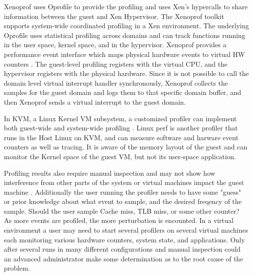 \indent Xenoprof uses Oprofile to provide the profiling and uses Xen's hypercalls to share information between the guest and Xen Hypervisor.  The Xenoprof toolkit supports system-wide coordinated profiling in a Xen environment.  The underlying Oprofile uses statistical profiling across domains and can track functions running in the user space, kernel space, and in the hypervisor.  Xenoprof provides a performance event interface which maps physical hardware events to virtual HW counters \cite{santos, menon2}.   The guest-level profiling registers with the virtual CPU, and the hypervisor registers with the physical hardware.  Since it is not possible to call the domain level virtual interrupt handler synchronously, Xenoprof collects the samples for the guest domain and logs them to that specific domain buffer, and then Xenoprof sends a virtual interrupt to the guest domain.

\indent In KVM, a Linux Kernel VM subsystem, a customized profiler can implement both guest-wide and system-wide profiling \cite{du2}.  Linux perf is another profiler that runs in the Host Linux on KVM, and can measure software and harware event counters as well as tracing.  It is aware of the memory layout of the guest and can monitor the Kernel space of the guest VM, but not its user-space application. 

\indent Profiling results also require manual inspection and may not show how interference from other parts of the system or virtual machines impact the guest machine \cite{traeger, knapp1}.  Additionally the user running the profiler needs to have some "guess" or prior knowledge about what event to sample, and the desired freqency of the sample.  Should the user sample Cache miss, TLB miss, or some other counter?  As more events are profiled, the more perturbation is encounted.  In a virtual environment a user may need to start several profilers on several virtual machines each monitoring various hardware counters, system state, and applications.  Only after several runs in many different configurations and manual inspection could an advanced administrator make some determination as to the root cause of the problem. 

